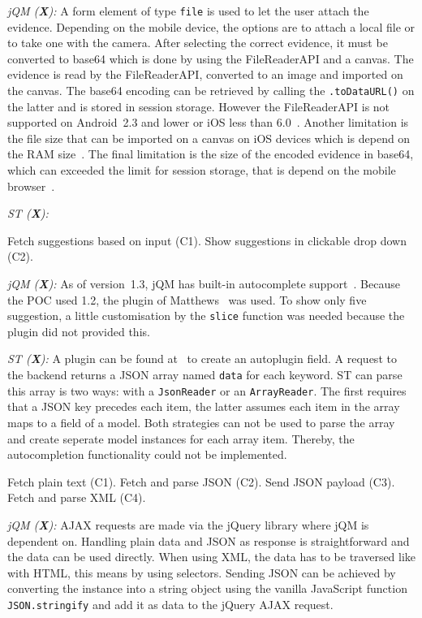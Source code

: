 \documentclass[a4paper]{artikel3}
\newcommand{\code}[1]{\texttt{#1}}
\renewcommand{\paragraph}[1]{\vspace{2mm} \noindent {\bf #1}  }
\newcommand{\framework}[2]{ \emph{#1 (\textbf{#2}): }} %
\newcommand{\challenge}[1]{\paragraph{#1}}
\begin{document}
\framework{jQM}{X}
A form element of type \code{file} is used to let the user attach the evidence.
Depending on the mobile device, the options are to attach a local file or to take one with the camera.
After selecting the correct evidence, it must be converted to base64 which is done by using the FileReaderAPI and a canvas.
The evidence is read by the FileReaderAPI, converted to an image and imported on the canvas.
The base64 encoding can be retrieved by calling the \code{.toDataURL()} on the latter and is stored in session storage.
However the FileReaderAPI is not supported on Android~2.3 and lower or iOS less than 6.0~\cite{Deveria2013a}.
Another limitation is the file size that can be imported on a canvas on iOS devices which is depend on the RAM size~\cite{Apple2012}.
The final limitation is the size of the encoded evidence in base64, which can exceeded the limit for session storage, that is depend on the mobile browser~\cite{Gonzalez2012}.

\framework{ST}{X}

\challenge{Autocomplete (C1,C2)}
Fetch suggestions based on input (C1).
Show suggestions in clickable drop down (C2).

\framework{jQM}{X}
As of version~1.3, jQM has built-in autocomplete support~\cite{JQuery2013c}.
Because the POC used 1.2, the plugin of Matthews~\cite{Matthews2013} was used.
To show only five suggestion, a little customisation by the \code{slice} function was needed because the plugin did not provided this.

\framework{ST}{X}
A plugin can be found at~\cite{Mysamplecode2012} to create an autoplugin field.  A request to the backend returns a JSON array named \code{data} for each keyword.  ST can parse this array is two ways:  with a \code{JsonReader} or an \code{ArrayReader}.  The first requires that a JSON key precedes each item,  the latter assumes each item in the array maps to a field of a model.  Both strategies can not be used to parse the array and create seperate model instances for each array item.  Thereby,  the autocompletion functionality could not be implemented.


\challenge{AJAX: text, JSON \& XML}
Fetch plain text (C1).
Fetch and parse JSON (C2).
Send JSON payload (C3).
Fetch and parse XML (C4).

\framework{jQM}{X}
AJAX requests are made via the jQuery library where jQM is dependent on.
Handling plain data and JSON as response is straightforward and the data can be used directly.
When using XML, the data has to be traversed like with HTML, this means by using selectors.
Sending JSON can be achieved by converting the instance into a string object using the vanilla JavaScript function \code{JSON.stringify} and add it as data to the jQuery AJAX request.
\end{document}
